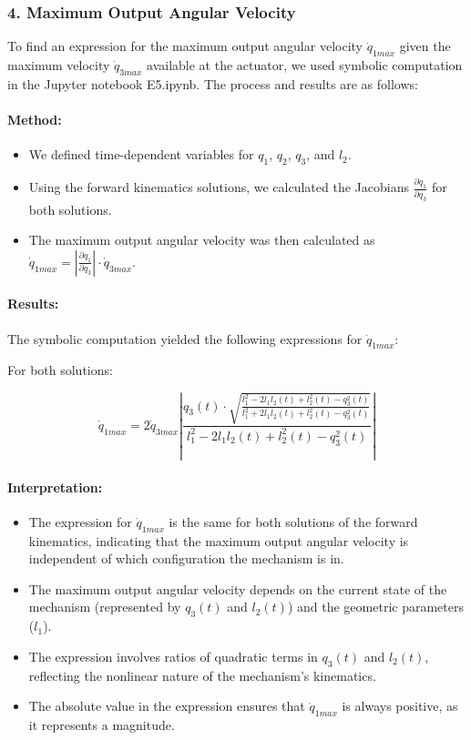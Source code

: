 \begin{solution}
    
\subsubsection*{4. Maximum Output Angular Velocity}

To find an expression for the maximum output angular velocity $\dot{q}_{1max}$ given the maximum velocity $\dot{q}_{3max}$ available at the actuator, we used symbolic computation in the Jupyter notebook E5.ipynb. The process and results are as follows:

\paragraph{Method:}
\begin{itemize}
	\item We defined time-dependent variables for $q_1$, $q_2$, $q_3$, and $l_2$.
	\item Using the forward kinematics solutions, we calculated the Jacobians $\frac{\partial q_1}{\partial q_3}$ for both solutions.
	\item The maximum output angular velocity was then calculated as $\dot{q}_{1max} = |\frac{\partial q_1}{\partial q_3}| \cdot \dot{q}_{3max}$.
\end{itemize}

\paragraph{Results:}
The symbolic computation yielded the following expressions for $\dot{q}_{1max}$:

For both solutions:

\begin{equation} \label{eq:jacob1}
\dot{q}_{1max}=2\dot{q}_{3max}\left|\frac{q_3(t)\cdot \sqrt{\frac{l_1^2 - 2l_1l_2(t) + l_2^2(t) - q_3^2(t)}{l_1^2 + 2l_1l_2(t) + l_2^2(t) - q_3^2(t)}}}{ {l_1^2 - 2l_1l_2(t) + l_2^2(t) - q_3^2(t)}} \right|
\end{equation}

\paragraph{Interpretation:}
\begin{itemize}
	\item The expression for $\dot{q}_{1max}$ is the same for both solutions of the forward kinematics, indicating that the maximum output angular velocity is independent of which configuration the mechanism is in.
	\item The maximum output angular velocity depends on the current state of the mechanism (represented by $q_3(t)$ and $l_2(t)$) and the geometric parameters ($l_1$).
	\item The expression involves ratios of quadratic terms in $q_3(t)$ and $l_2(t)$, reflecting the nonlinear nature of the mechanism's kinematics.
	\item The absolute value in the expression ensures that $\dot{q}_{1max}$ is always positive, as it represents a magnitude.
\end{itemize}


\end{solution}
